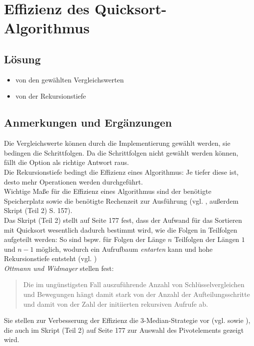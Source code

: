 \chapter{Effizienz des Quicksort-Algorithmus}\label{ch:quicksort}

\section*{Lösung}

\begin{itemize}
    \item von den gewählten Vergleichswerten
    \item von der Rekursionstiefe
\end{itemize}


\section*{Anmerkungen und Ergänzungen}

Die Vergleichswerte können durch die Implementierung gewählt werden, sie bedingen die Schrittfolgen.
Da die Schrittfolgen nicht gewählt werden können, fällt die Option als richtige Antwort raus.\\
Die Rekursionstiefe bedingt die Effizienz eines Algorithmus: Je tiefer diese ist, desto mehr Operationen werden durchgeführt.\\

Wichtige Maße für die Effizienz eines Algorithmus sind der benötigte Speicherplatz sowie die benötigte Rechenzeit zur Ausführung (vgl. \cite[2]{OW17a}, außerdem Skript (Teil 2) S. 157).
\\
Das Skript (Teil 2) stellt auf Seite 177 fest, dass der Aufwand für das Sortieren mit Quicksort wesentlich dadurch bestimmt wird, wie die Folgen in Teilfolgen aufgeteilt werden: So sind bspw. für Folgen der Länge $n$ Teilfolgen der Längen $1$ und $n-1$ möglich, wodurch ein Aufrufbaum \textit{entarten} kann und hohe Rekursionstiefe entsteht (vgl. \cite[177 f.]{GD18e})
\\

\textit{Ottmann und Widmayer} stellen fest:

\blockquote[{\cite[96]{OW17b}}]{
    Die im ungünstigsten Fall auszuführende Anzahl von Schlüsselvergleichen und Bewegungen
    hängt damit stark von der Anzahl der Aufteilungsschritte und damit von der Zahl der
    initiierten rekursiven Aufrufe ab.
}

Sie stellen zur Verbesserung der Effizienz die 3-Median-Strategie vor (vgl. \cite[102]{OW17b} sowie \cite[183]{GD18e}), die auch im Skript (Teil 2) auf Seite 177 zur Auswahl des Pivotelements gezeigt wird.